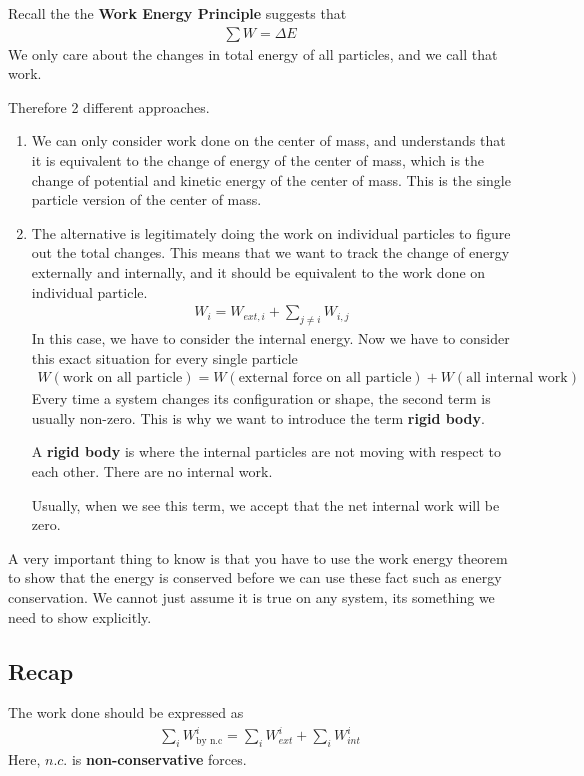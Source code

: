 \documentclass[12pt]{article}
\begin{document}
Recall the the \textbf{Work Energy Principle} suggests that
\begin{align}
\sum W = \Delta E
\end{align}
We only care about the changes in total energy of all particles, and we call that work. 

Therefore 2 different approaches. 
\begin{enumerate}
    \item We can only consider work done on the center of mass, and understands that it is equivalent to the change of energy of the center of mass, which is the change of potential and kinetic energy of the center of mass. This is the single particle version of the center of mass.
    \item The alternative is legitimately doing the work on individual particles to figure out the total changes. This means that we want to track the change of energy externally and internally, and it should be equivalent to the work done on individual particle. 
    \begin{align}
    W_{i} = W_{ext,i} + \sum_{j\neq i} W_{i,j}
    \end{align}
    In this case, we have to consider the internal energy. Now we have to consider this exact situation for every single particle
    \begin{align}
    W(\text{work on all particle}) = W(\text{external force on all particle}) + W(\text{all internal work})
    \end{align}
    Every time a system changes its configuration or shape, the second term is usually non-zero. This is why we want to introduce the term \textbf{rigid body}. 

    A \textbf{rigid body} is where the internal particles are not moving with respect to each other. There are no internal work.

    Usually, when we see this term, we accept that the net internal work will be zero. 
\end{enumerate}

A very important thing to know is that you have to use the work energy theorem to show that the energy is conserved before we can use these fact such as energy conservation. We cannot just assume it is true on any system, its something we need to show explicitly. 



\subsection{Recap}
The work done should be expressed as
\begin{align}
\sum_i W^i_{\text{by n.c}} = \sum_i W^i_{ext} + \sum_i W^i_{int}
\end{align}
Here, $n.c.$ is \textbf{non-conservative} forces. 
\end{document}
